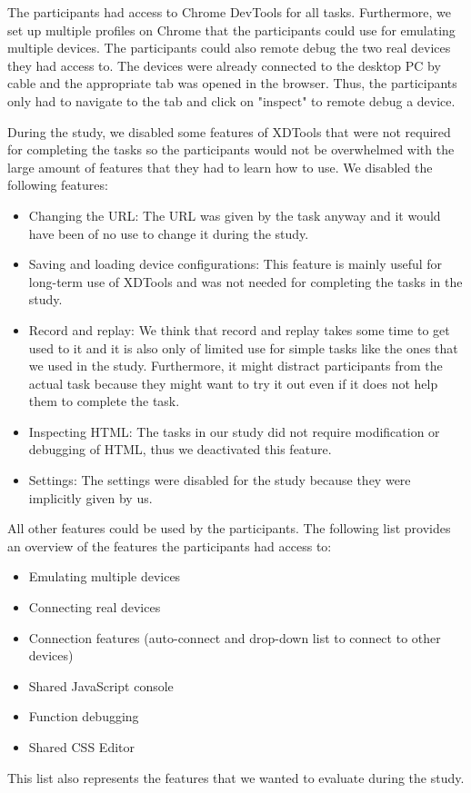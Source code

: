 The participants had access to Chrome DevTools for all tasks. Furthermore, we set up multiple profiles on Chrome that the participants could use for emulating multiple devices. The participants could also remote debug the two real devices they had access to. The devices were already connected to the desktop PC by cable and the appropriate tab was opened in the browser. Thus, the participants only had to navigate to the tab and click on "inspect" to remote debug a device. 

During the study, we disabled some features of XDTools that were not required for completing the tasks so the participants would not be overwhelmed with the large amount of features that they had to learn how to use. We disabled the following features:
\begin{itemize}
	\item Changing the URL: The URL was given by the task anyway and it would have been of no use to change it during the study.
	\item Saving and loading device configurations: This feature is mainly useful for long-term use of XDTools and was not needed for completing the tasks in the study.
	\item Record and replay: We think that record and replay takes some time to get used to it and it is also only of limited use for simple tasks like the ones that we used in the study. Furthermore, it might distract participants from the actual task because they might want to try it out even if it does not help them to complete the task.
	\item Inspecting HTML: The tasks in our study did not require modification or debugging of HTML, thus we deactivated this feature.
	\item Settings: The settings were disabled for the study because they were implicitly given by us.
\end{itemize}

All other features could be used by the participants. The following list provides an overview of the features the participants had access to:
\begin{itemize}
	\item Emulating multiple devices
	\item Connecting real devices
	\item Connection features (auto-connect and drop-down list to connect to other devices)
	\item Shared JavaScript console
	\item Function debugging
	\item Shared CSS Editor
\end{itemize}
This list also represents the features that we wanted to evaluate during the study.

